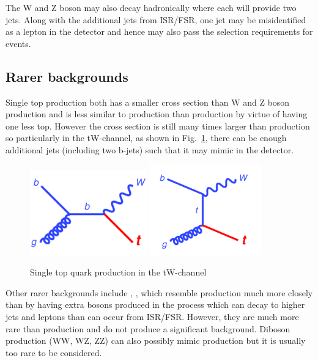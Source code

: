 The W and Z boson may also decay hadronically where each will provide two jets. Along with the additional jets from ISR/FSR, one jet may be misidentified as a lepton in the detector and hence may also pass the selection requirements for \tttt events.

\subsection{Rarer backgrounds}
Single top production both has a smaller cross section than W and Z boson production and is less similar to \tttt production than \ttbar production by virtue of having one less top. However the cross section is still many times larger than \tttt production so particularly in the tW-channel, as shown in Fig.~\ref{fig:ttbarAdd}, there can be enough additional jets (including two b-jets) such that it may mimic \tttt in the detector.

\begin{figure}[ht!]
\begin{center}
    \includegraphics[width=0.45\textwidth]{images/Theory/singleTop_tW.png}
    \includegraphics[width=0.43\textwidth]{images/Theory/singleTop_tW_2.png}
    \caption{Single top quark production in the tW-channel}
    \label{fig:ttbarAdd}
\end{center}
\end{figure}

Other rarer backgrounds include \ttH, \ttZ, \ttW which resemble \tttt production much more closely than \ttbar by having extra bosons produced in the process which can decay to higher \pt jets and leptons than can occur from ISR/FSR. However, they are much more rare than \ttbar production and do not produce a significant background. Diboson production (WW, WZ, ZZ) can also possibly mimic \tttt production but it is usually too rare to be considered.

